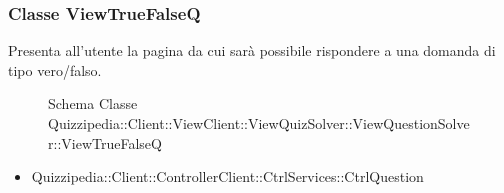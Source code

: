 \subsubsection{Classe ViewTrueFalseQ}
Presenta all'utente la pagina da cui sarà possibile rispondere a una domanda di tipo vero/falso.
\begin{figure}[H]
\centering
\noindent{}
\caption[Schema Classe ViewTrueFalseQ]{Schema Classe Quizzipedia::Client::ViewClient::ViewQuizSolver::ViewQuestionSolver::ViewTrueFalseQ}
\end{figure}
\begin{itemize}
\item Quizzipedia::Client::ControllerClient::CtrlServices::CtrlQuestion
\end{itemize}
